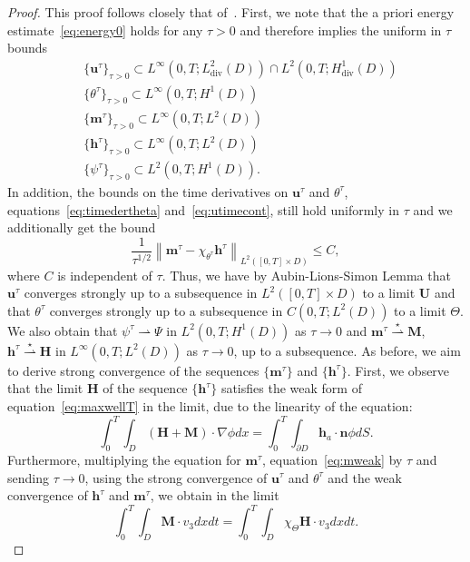 \documentclass[10pt,letterpaper,twoside]{amsart}
\theoremstyle{definition}{\newtheorem{definition}[lemma]{Definition}}
\theoremstyle{note}{\newtheorem{claim}{Claim}[section]
\newtheorem*{claim*}{Claim}}
\numberwithin{equation}{section}
\newcommand{\dom}{D}
\newcommand{\norm}[1]{\left\| #1 \right\|}
\newcommand{\weakstar}{\overset{\star}\rightharpoonup}
\newcommand{\Grad}{\nabla}
\newcommand{\Div}{\operatorname{div}}
\newcommand{\weak}{\rightharpoonup}
\newcommand{\hdiv}{L^2_{\Div}(\dom)}
\newcommand{\V}{H^1_{\Div}(\dom)}
\newcommand{\Bu}{\mathbf{U}}
\newcommand{\Bm}{\mathbf{M}}
\newcommand{\Bh}{\mathbf{H}}
\newcommand{\bh}{\mathbf{h}}
\newcommand{\bmt}{\mathbf{m}^{\tau}}
\newcommand{\bht}{\mathbf{h}^{\tau}}
\newcommand{\but}{\mathbf{u}^{\tau}}
\newcommand{\tht}{\theta^{\tau}}
\newcommand{\psit}{\psi^{\tau}}
\begin{document}
\begin{proof}
	This proof follows closely that of~\cite[Theorem 4.1]{Nochetto2019}.
	First, we note that the a priori energy estimate~\eqref{eq:energy0} holds for any $\tau>0$ and therefore implies the uniform in $\tau$ bounds
	\begin{align*}
		&\{\but\}_{\tau>0}\subset L^\infty(0,T;\hdiv)\cap L^2(0,T;\V)\\
		&\{\tht\}_{\tau>0}\subset L^\infty(0,T;H^1(\dom))\\
		&\{\bmt\}_{\tau>0}\subset L^\infty(0,T;L^2(\dom))\\
		&\{\bht\}_{\tau>0}\subset L^\infty(0,T;L^2(\dom))\\
		&\{\psit\}_{\tau>0}\subset L^2(0,T;H^1(\dom)).
	\end{align*}
	In addition, the bounds on the time derivatives on $\but$ and $\tht$, equations~\eqref{eq:timedertheta} and~\eqref{eq:utimecont}, still hold uniformly in $\tau$ and we additionally get the bound
	\begin{equation}\label{eq:relax}
		\frac1{\tau^{1/2}}\norm{\bmt-\chi_{\tht} \bht}_{L^2([0,T]\times\dom)}\leq C,
	\end{equation}
	where $C$ is independent of $\tau$. Thus, we have by Aubin-Lions-Simon Lemma that $\but$   converges strongly up to a subsequence in $L^2([0,T]\times\dom)$ to a limit $\Bu$ and that $\tht$ converges strongly up to a subsequence in $C(0,T;L^2(\dom))$ to a limit $\Theta$. We also obtain that $\psit\weak \Psi$ in $L^2(0,T;H^1(\dom))$ as $\tau\to 0$ and $\bmt\weakstar \Bm$, $\bht\weakstar\Bh$ in $L^\infty(0,T;L^2(\dom))$ as $\tau\to 0$, up to a subsequence. As before, we aim to derive strong convergence of the sequences $\{\bmt\}$ and $\{\bht\}$. First, we observe that the limit $\Bh$ of the sequence $\{\bht\}$ satisfies the weak form of equation~\eqref{eq:maxwellT} in the limit, due to the linearity of the equation:
	\begin{equation}\label{eq:Hweak}
		\int_0^T\int_{\dom}(\Bh+\Bm)\cdot \Grad \phi dx = \int_0^T\int_{\partial\dom} \bh_a\cdot \mathbf{n} \phi dS. 
	\end{equation}
	Furthermore, multiplying the equation for $\bmt$,  equation~\eqref{eq:mweak} by $\tau$ and sending $\tau \to 0$, using the strong convergence of $\but$ and $\tht$ and the weak convergence of $\bht$ and $\bmt$, we obtain in the limit
	\begin{equation}
		\label{eq:Mweak}
		\int_0^T\int_{\dom} \Bm\cdot v_3 dx dt = \int_0^T\int_{\dom} \chi_{\Theta} \Bh \cdot v_3 dx dt.
	\end{equation} 

\end{proof}
\end{document}
